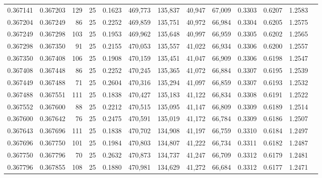 \begin{tabular}{rrrrrrrrrrrrr}
0.367141 & 0.367203 &   129 &  25 &                                     0.1623 & 469,773 & 135,837 &  40,947 &  67,009 & 0.3303 & 0.6207 & 1.2583 \\
0.367204 & 0.367249 &    86 &  25 &                                     0.2252 & 469,859 & 135,751 &  40,972 &  66,984 & 0.3304 & 0.6205 & 1.2575 \\
0.367249 & 0.367298 &   103 &  25 &                                     0.1953 & 469,962 & 135,648 &  40,997 &  66,959 & 0.3305 & 0.6202 & 1.2565 \\
0.367298 & 0.367350 &    91 &  25 &                                     0.2155 & 470,053 & 135,557 &  41,022 &  66,934 & 0.3306 & 0.6200 & 1.2557 \\
0.367350 & 0.367408 &   106 &  25 &                                     0.1908 & 470,159 & 135,451 &  41,047 &  66,909 & 0.3306 & 0.6198 & 1.2547 \\
0.367408 & 0.367448 &    86 &  25 &                                     0.2252 & 470,245 & 135,365 &  41,072 &  66,884 & 0.3307 & 0.6195 & 1.2539 \\
0.367449 & 0.367488 &    71 &  25 &                                     0.2604 & 470,316 & 135,294 &  41,097 &  66,859 & 0.3307 & 0.6193 & 1.2532 \\
0.367488 & 0.367551 &   111 &  25 &                                     0.1838 & 470,427 & 135,183 &  41,122 &  66,834 & 0.3308 & 0.6191 & 1.2522 \\
0.367552 & 0.367600 &    88 &  25 &                                     0.2212 & 470,515 & 135,095 &  41,147 &  66,809 & 0.3309 & 0.6189 & 1.2514 \\
0.367600 & 0.367642 &    76 &  25 &                                     0.2475 & 470,591 & 135,019 &  41,172 &  66,784 & 0.3309 & 0.6186 & 1.2507 \\
0.367643 & 0.367696 &   111 &  25 &                                     0.1838 & 470,702 & 134,908 &  41,197 &  66,759 & 0.3310 & 0.6184 & 1.2497 \\
0.367696 & 0.367750 &   101 &  25 &                                     0.1984 & 470,803 & 134,807 &  41,222 &  66,734 & 0.3311 & 0.6182 & 1.2487 \\
0.367750 & 0.367796 &    70 &  25 &                                     0.2632 & 470,873 & 134,737 &  41,247 &  66,709 & 0.3312 & 0.6179 & 1.2481 \\
0.367796 & 0.367855 &   108 &  25 &                                     0.1880 & 470,981 & 134,629 &  41,272 &  66,684 & 0.3312 & 0.6177 & 1.2471 \\

\end{tabular}
